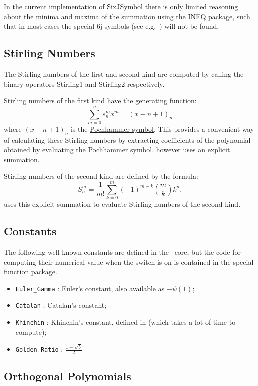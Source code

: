 In the current implementation of \f{SixJSymbol} there is only limited
reasoning about the minima and maxima of the summation using
the INEQ package, such that in most
cases the special 6j-symbols (see e.g.\ \cite{LandoltBoernstein:68})
will not be found.

\subsection{Stirling Numbers}
\hypertarget{STIRL}{}
The Stirling numbers of the first and second kind are computed
by calling the binary operators \f{Stirling1} and \f{Stirling2}
respectively.

Stirling numbers of the first kind have the generating function:
\[\sum_{m=0}^n s_n^m x^m  =  (x-n+1)_n\]
where $(x-n+1)_n$ is the \hyperlink{POCH}{Pochhammer symbol}. This provides
a convenient way of calculating these Stirling numbers by
extracting coefficients of the polynomial obtained by evaluating the
Pochhammer symbol.  \REDUCE however uses an explicit summation.

Stirling numbers of the second kind are defined by the formula:
\[S_n^m = \frac{1}{m!} \sum_{k=0}^m (-1)^{m-k} \binom{m}{k} k^n.\]
\REDUCE uses this explicit summation to evaluate Stirling numbers of the
second kind.

\subsection{Constants}
\hypertarget{CONSTS}{}

The following well-known constants are defined in the \REDUCE\ core,
but the code for computing their numerical value when the switch 
is on is contained in the special function package.
\begin{itemize}
\item \texttt{Euler\_Gamma} : Euler's constant, also available as $-\psi(1)$;
\item \texttt{Catalan} : Catalan's constant;
\item \texttt{Khinchin} : Khinchin's constant, defined in \cite{Khinchin:64}
(which takes a lot of time to compute);
\item \texttt{Golden\_Ratio} : $\displaystyle\frac{1 + \sqrt{5}}{2}$
\end{itemize}


\subsection{Orthogonal Polynomials}
\hypertarget{POLYFN}{}

